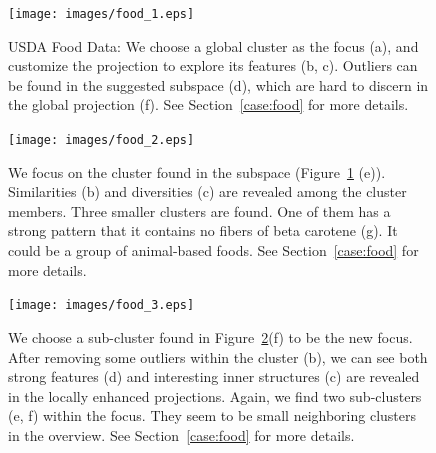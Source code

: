 \begin{figure}[htbp]
\centering
  \texttt{[image: images/food\_1.eps]}%
  \caption{USDA Food Data: We choose a global cluster as the focus (a), and customize the projection to explore its features (b, c). Outliers can be found in the suggested subspace (d), which are hard to discern in the global projection (f). See Section~\ref{case:food} for more details.}
\label{fig:food1}
  \end{figure}

\begin{figure}[htbp]
\centering
  \texttt{[image: images/food\_2.eps]}%
  \caption{We focus on the cluster found in the subspace (Figure~\ref{fig:food1} (e)). Similarities (b) and diversities (c) are revealed among the cluster members. Three smaller clusters are found. One of them has a strong pattern that it contains no fibers of beta carotene (g). It could be a group of animal-based foods. See Section~\ref{case:food} for more details.}
\label{fig:food2}
  \end{figure}

\begin{figure}[htbp]
\centering
  \texttt{[image: images/food\_3.eps]}%
  \caption{We choose a sub-cluster found in Figure~\ref{fig:food2}(f) to be the new focus. After removing some outliers within the cluster (b), we can see both strong features (d) and interesting inner structures (c) are revealed in the locally enhanced projections. Again, we find two sub-clusters (e, f) within the focus. They seem to be small neighboring clusters in the overview. See Section~\ref{case:food} for more details.}
\label{fig:food3}
  \end{figure}

